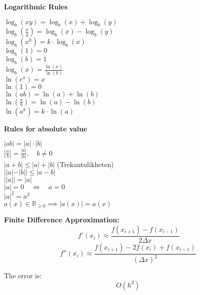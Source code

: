 \documentclass[a4paper,11pt]{article}
\renewcommand{\textbf}[1]{{\scriptsize	\bfseries #1}}
\begin{document}
\begin{footnotesize}
\begin{multicols}{2}
\begin{minipage}{\linewidth}
\textbf{Logarithmic Rules}

\(\log_b(xy) = \log_b(x) + \log_b(y)\) \\ 
\(\log_b\left(\frac{x}{y}\right) = \log_b(x) - \log_b(y)\) \\
\(\log_b(x^k) = k \cdot \log_b(x)\) \\
\(\log_b(1) = 0\) \\
\(\log_b(b) = 1\) \\
\(\log_b(x) = \frac{\ln(x)}{\ln(b)}\) \\
\(\ln(e^x) = x\) \\
\(\ln(1) = 0\) \\
\(\ln(ab) = \ln(a) + \ln(b)\) \\
\(\ln\left(\frac{a}{b}\right) = \ln(a) - \ln(b)\) \\
\(\ln(a^k) = k \cdot \ln(a)\)


\end{minipage}
\begin{minipage}{\linewidth}

\textbf{Rules for absolute value} 

\(|ab| = |a| \cdot |b|\)\\
\(\left| \frac{a}{b} \right| = \frac{|a|}{|b|}, \quad b \neq 0\)\\
\(|a + b| \leq |a| + |b|\)  (Trekantulikheten)\\
\(||a| - |b|| \leq |a - b|\)\\
\(||a|| = |a|\)\\
\(|a| = 0 \quad \Leftrightarrow \quad a = 0\)\\
\(|a|^2 = a^2\)\\
\(a(x) \in \mathbb{R}_{\geq 0} \implies |a(x)| = a(x)\)\\

\end{minipage}

\end{multicols}
\begin{minipage}{\linewidth}
\textbf{Finite Difference Approximation:}
\[
\ f'(x_i) \approx  \frac{f(x_{i+1}) - f(x_{i-1})}{2\Delta x}
\]
\[
f''(x_i) \approx  \frac{f(x_{i+1}) - 2f(x_i) + f(x_{i-1})}{(\Delta x)^2}
\]



The error is: \[O(h^2)\]

\end{minipage}

\begin{multicols}{2}





\end{multicols}



\end{footnotesize}
\end{document}
